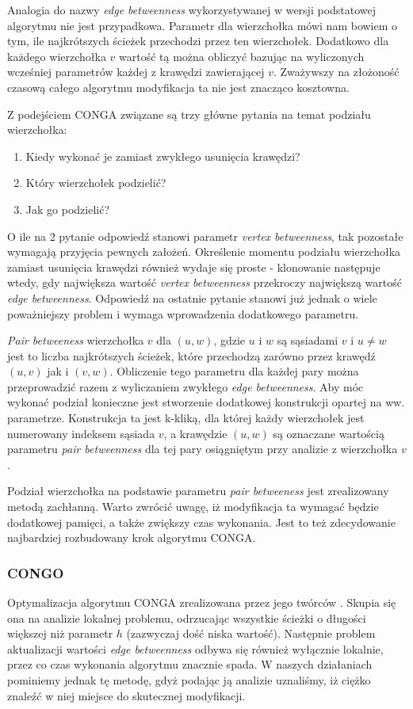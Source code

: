 \documentclass{article}
\begin{document}
Analogia do nazwy \textit{edge betweenness} wykorzystywanej w wersji podstatowej algorytmu nie jest przypadkowa. Parametr dla wierzchołka mówi nam bowiem o tym, ile najkrótszych ścieżek przechodzi przez ten wierzchołek. Dodatkowo dla każdego wierzchołka ${v}$ wartość tą można obliczyć bazując na wyliczonych wcześniej parametrów każdej z krawędzi zawierającej ${v}$. Zważywszy na złożoność czasową całego algorytmu modyfikacja ta nie jest znacząco kosztowna.

Z podejściem CONGA związane są trzy główne pytania na temat podziału wierzchołka:
\begin{enumerate}
\item Kiedy wykonać je zamiast zwykłego usunięcia krawędzi?
\item Który wierzchołek podzielić?
\item Jak go podzielić?
\end{enumerate} 

O ile na 2 pytanie odpowiedź stanowi parametr \textit{vertex betweenness}, tak pozostałe wymagają przyjęcia pewnych założeń. Określenie momentu podziału wierzchołka zamiast usunięcia krawędzi również wydaje się proste - klonowanie następuje wtedy, gdy największa wartość \textit{vertex betweenness} przekroczy największą wartość \textit{edge betweenness}. Odpowiedź na ostatnie pytanie stanowi już jednak o wiele poważniejszy problem i wymaga wprowadzenia dodatkowego parametru.

\textit{Pair betweeness} wierzchołka $v$ dla $(u,w)$, gdzie $u$ i $w$ są sąsiadami $v$ i $u \neq w$ jest to liczba najkrótszych ścieżek, które przechodzą zarówno przez krawędź $(u,v)$ jak i $(v,w)$. Obliczenie tego parametru dla każdej pary można przeprowadzić razem z wyliczaniem zwykłego \textit{edge betweenness}. Aby móc wykonać podział konieczne jest stworzenie dodatkowej konstrukcji opartej na ww. parametrze. Konstrukcja ta jest k-kliką, dla której każdy wierzchołek jest numerowany indeksem sąsiada $v$, a krawędzie $(u,w)$ są oznaczane wartością parametru \textit{pair betweenness} dla tej pary osiągniętym przy analizie z wierzchołka $v$.

Podział wierzchołka na podstawie parametru \textit{pair betweeness} jest zrealizowany metodą zachłanną. Warto zwrócić uwagę, iż modyfikacja ta wymagać będzie dodatkowej pamięci, a także zwiększy czas wykonania. Jest to też zdecydowanie najbardziej rozbudowany krok algorytmu CONGA.
\subsubsection{CONGO}
Optymalizacja algorytmu CONGA zrealizowana przez jego twórców \cite{is-paper3}. Skupia się ona na analizie lokalnej problemu, odrzucając wszystkie ścieżki o długości większej niż parametr $h$ (zazwyczaj dość niska wartość). Następnie problem aktualizacji wartości \textit{edge betweenness} odbywa się również wyłącznie lokalnie, przez co czas wykonania algorytmu znacznie spada. W naszych działaniach pominiemy jednak tę metodę, gdyż podając ją analizie uznaliśmy, iż ciężko znaleźć w niej miejsce do skutecznej modyfikacji.
\end{document}
